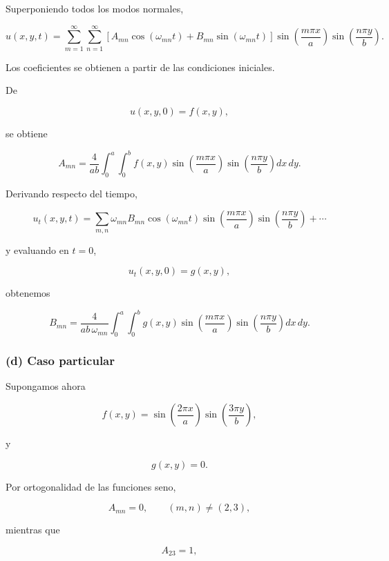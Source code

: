 \documentclass[12pt]{article}
\begin{document}
Superponiendo todos los modos normales,

\begin{equation}
\boxed{
u(x,y,t)
=
\sum_{m=1}^{\infty}
\sum_{n=1}^{\infty}
\left[
A_{mn}\cos(\omega_{mn}t)
+
B_{mn}\sin(\omega_{mn}t)
\right]
\sin\!\left(\frac{m\pi x}{a}\right)
\sin\!\left(\frac{n\pi y}{b}\right).
}
\end{equation}

Los coeficientes se obtienen a partir de las condiciones iniciales.

De

\[
u(x,y,0)=f(x,y),
\]

se obtiene

\begin{equation}
A_{mn}
=
\frac{4}{ab}
\int_0^a
\int_0^b
f(x,y)
\sin\!\left(\frac{m\pi x}{a}\right)
\sin\!\left(\frac{n\pi y}{b}\right)
dx\,dy.
\end{equation}

Derivando respecto del tiempo,

\[
u_t(x,y,t)
=
\sum_{m,n}
\omega_{mn}
B_{mn}
\cos(\omega_{mn}t)
\sin\!\left(\frac{m\pi x}{a}\right)
\sin\!\left(\frac{n\pi y}{b}\right)
+\cdots
\]

y evaluando en $t=0$,

\[
u_t(x,y,0)=g(x,y),
\]

obtenemos

\begin{equation}
B_{mn}
=
\frac{4}
{ab\,\omega_{mn}}
\int_0^a
\int_0^b
g(x,y)
\sin\!\left(\frac{m\pi x}{a}\right)
\sin\!\left(\frac{n\pi y}{b}\right)
dx\,dy.
\end{equation}

\subsubsection*{(d) Caso particular}

Supongamos ahora

\begin{equation}
f(x,y)
=
\sin\!\left(\frac{2\pi x}{a}\right)
\sin\!\left(\frac{3\pi y}{b}\right),
\end{equation}

y

\[
g(x,y)=0.
\]

Por ortogonalidad de las funciones seno,

\[
A_{mn}=0,
\qquad
(m,n)\neq(2,3),
\]

mientras que

\[
A_{23}=1,
\]
\end{document}

